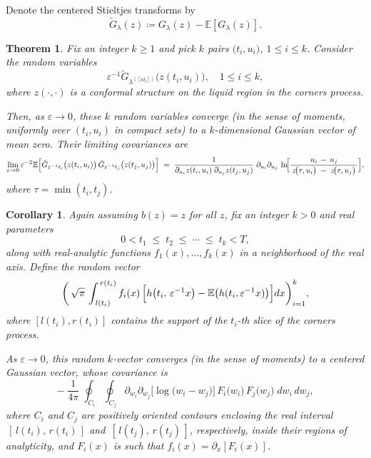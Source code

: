 \documentclass[letterpaper,11pt,oneside,reqno]{article}
\numberwithin{equation}{section}
\newtheorem{corollary}[proposition]{Corollary}
\newtheorem{theorem}[proposition]{Theorem}
\theoremstyle{definition}
\begin{document}
Denote the centered Stieltjes transforms by 
\begin{equation*}
	\tilde G_{\lambda}(z)\coloneqq G_\lambda(z)-\mathbb{E}[G_\lambda(z)].
\end{equation*}

\begin{theorem}
Fix an integer \(k \ge 1\) and pick \(k\) pairs \(\bigl(t_i,u_i\bigr)\), \(1 \le i \le k\).  
Consider the random variables
\[
	\varepsilon^{-1}\tilde G_{\lambda^{([n t_i])}}\bigl(z(t_i,u_i)\bigr),
\quad 1\le i\le k,
\]
where \(z(\cdot,\cdot)\) is 
a conformal structure on the liquid region in the corners process.

Then, as \(\varepsilon \to 0\), these \(k\) random variables converge (in the sense of moments, uniformly over \((t_i,u_i)\) in compact sets) to a \(k\)-dimensional Gaussian vector of mean zero.  Their limiting covariances are 
\[
\lim_{\varepsilon \to 0} 
\varepsilon^{-2}\mathbb{E}\Bigl[
\tilde G_{\varepsilon^{-1}t_i}\bigl(z(t_i,u_i)\bigr)\,
\tilde G_{\varepsilon^{-1}t_j}\bigl(z(t_j,u_j)\bigr)
\Bigr]
\;=\;
\frac{1}{
\partial_{u_i}z(t_i,u_i)
\;\partial_{u_j}z(t_j,u_j)
}
\;\partial_{u_i}\partial_{u_j}\,
\ln \!\Bigl[
\frac{u_i \,-\,u_j}{
\,z\!\bigl(\tau,u_i\bigr) \;-\; z\!\bigl(\tau,u_j\bigr)\,}
\Bigr],
\]
where \(\tau = \min(t_i,t_j)\).
\end{theorem}

\begin{corollary}
\label{cor:corollary6.9-specialized}
Again assuming \(b(z)=z\) for all \(z\), fix an integer \(k>0\) and real parameters
\[
0 < t_1 \;\le\; t_2 \;\le\;\cdots\;\le\; t_k < T,
\]
along with real-analytic functions \(f_1(x),\ldots,f_k(x)\) in a neighborhood of the real axis.  Define the random vector
\[
\biggl(\,
\sqrt{\pi}\,\int_{\,l(t_i)}^{\,r(t_i)}
f_i(x)\,\Bigl[
h\bigl(t_i,\,\varepsilon^{-1}x\bigr)
-\mathbb{E}\bigl(h(t_i,\varepsilon^{-1}x)\bigr)
\Bigr]\!\,dx
\biggr)_{i=1}^k,
\]
where $[l(t_i),r(t_i)]$ contains the support of the $t_i$-th slice of the corners process.

As \(\varepsilon \to 0\), this random \(k\)-vector converges (in the sense of moments) to a centered Gaussian vector, whose covariance is 
\[
-\;\frac{1}{4\pi}
\;\oint_{C_i}\!\oint_{C_j}\!
\partial_{w_i}\partial_{w_j}
\bigl[\log\bigl(w_i - w_j\bigr)\bigr]\,
F_i\bigl(w_i\bigr)\,F_j\bigl(w_j\bigr)
\;dw_i\,dw_j,
\]
where \(C_i\) and \(C_j\) are positively oriented contours enclosing the real interval \(\,[\,l(t_i),\,r(t_i)\,]\) and \(\,[\,l(t_j),\,r(t_j)\,]\), respectively, inside their regions of analyticity, and \(F_i(x)\) is such that \(f_i(x)=\partial_x[F_i(x)]\).
\end{corollary}
\end{document}
